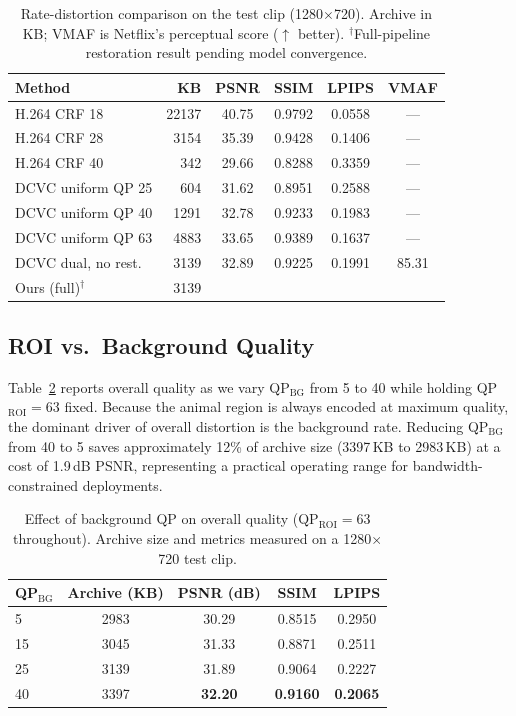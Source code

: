 \documentclass[10pt, conference]{IEEEtran}
\begin{document}
\begin{table}[t]
\centering
\caption{Rate-distortion comparison on the test clip (1280$\times$720). Archive in KB; VMAF is Netflix's perceptual score ($\uparrow$ better). $^\dagger$Full-pipeline restoration result pending model convergence.}
\label{tab:rd}
\begin{tabular}{lrcccc}
\toprule
Method & KB & PSNR & SSIM & LPIPS & VMAF \\
\midrule
H.264 CRF 18       & 22137 & 40.75 & 0.9792 & 0.0558 & --- \\
H.264 CRF 28       &  3154 & 35.39 & 0.9428 & 0.1406 & --- \\
H.264 CRF 40       &   342 & 29.66 & 0.8288 & 0.3359 & --- \\
DCVC uniform QP 25 &   604 & 31.62 & 0.8951 & 0.2588 & --- \\
DCVC uniform QP 40 &  1291 & 32.78 & 0.9233 & 0.1983 & --- \\
DCVC uniform QP 63 &  4883 & 33.65 & 0.9389 & 0.1637 & --- \\
DCVC dual, no rest.&  3139 & 32.89 & 0.9225 & 0.1991 & 85.31 \\
Ours (full)$^\dagger$ & 3139 & \TODO{\textbf{}} & \TODO{\textbf{}} & \TODO{\textbf{}} & \TODO{\textbf{}} \\
\bottomrule
\end{tabular}
\end{table}

\subsection{ROI vs.\ Background Quality}

Table~\ref{tab:roi_bg} reports overall quality as we vary QP$_{\text{BG}}$ from 5 to 40 while holding QP$_{\text{ROI}}{=}63$ fixed. Because the animal region is always encoded at maximum quality, the dominant driver of overall distortion is the background rate. Reducing QP$_{\text{BG}}$ from 40 to 5 saves approximately 12\% of archive size (3397\,KB to 2983\,KB) at a cost of 1.9\,dB PSNR, representing a practical operating range for bandwidth-constrained deployments.

\begin{table}[t]
\centering
\caption{Effect of background QP on overall quality (QP$_{\text{ROI}}{=}63$ throughout). Archive size and metrics measured on a 1280$\times$720 test clip.}
\label{tab:roi_bg}
\setlength{\tabcolsep}{5pt}
\begin{tabular}{lcccc}
\toprule
QP$_{\text{BG}}$ & Archive (KB) & PSNR (dB) & SSIM & LPIPS \\
\midrule
 5 &  2983 & 30.29 & 0.8515 & 0.2950 \\
15 &  3045 & 31.33 & 0.8871 & 0.2511 \\
25 &  3139 & 31.89 & 0.9064 & 0.2227 \\
40 &  3397 & \textbf{32.20} & \textbf{0.9160} & \textbf{0.2065} \\
\bottomrule
\end{tabular}
\end{table}
\end{document}
